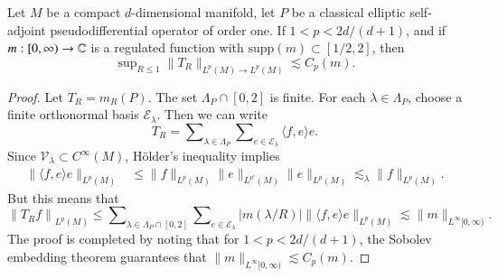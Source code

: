 \begin{lemma} \label{lowjLemma}
    Let $M$ be a compact $d$-dimensional manifold, let $P$ be a classical elliptic self-adjoint pseudodifferential operator of order one. If $1 < p < 2d/(d+1)$, and if $m: [0,\infty) \to \operatorname{\mathbb{C}}$ is a regulated function with $\text{supp}(m) \subset [1/2,2]$, then
    \begin{equation}
        \sup\nolimits_{R \leq 1} \| T_R \|_{L^p(M) \to L^p(M)} \lesssim C_p(m).
    \end{equation}
\end{lemma}
\begin{proof}
    Let $T_R = m_R(P)$. The set $\Lambda_P \cap [0,2]$ is finite. For each $\lambda \in \Lambda_P$, choose a finite orthonormal basis $\mathcal{E}_\lambda$. Then we can write
    \begin{equation}
        T_R = \sum\nolimits_{\lambda \in \Lambda_P} \sum\nolimits_{e \in \mathcal{E}_\lambda} \langle f, e \rangle e.
    \end{equation}
    Since $\mathcal{V}_\lambda \subset C^\infty(M)$, H\"{o}lder's inequality implies
    \begin{equation}
    \begin{split}
        \| \langle f, e \rangle e \|_{L^p(M)} &\leq \| f \|_{L^p(M)} \| e \|_{L^{p'}(M)} \| e \|_{L^p(M)} \lesssim_\lambda \| f \|_{L^p(M)}.
    \end{split}
    \end{equation}
    But this means that
    \begin{equation}
        \left\| T_R f \right\|_{L^p(M)} \leq \sum\nolimits_{\lambda \in \Lambda_P \cap [0,2]} \sum\nolimits_{e \in \mathcal{E}_\lambda} |m(\lambda/R)| \| \langle f, e \rangle e \|_{L^p(M)} \lesssim \| m \|_{L^\infty[0,\infty)}.
    \end{equation}
    The proof is completed by noting that for $1 < p < 2d/(d+1)$, the Sobolev embedding theorem guarantees that $\| m \|_{L^\infty[0,\infty)} \lesssim C_p(m)$.
\end{proof}

